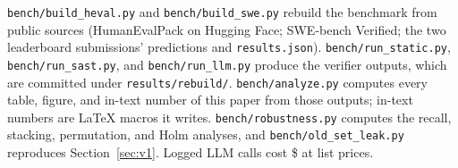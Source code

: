 \texttt{bench/build\_heval.py} and \texttt{bench/build\_swe.py} rebuild the benchmark from public sources (HumanEvalPack on Hugging Face; SWE-bench Verified; the two leaderboard submissions' predictions and \texttt{results.json}). \texttt{bench/run\_static.py}, \texttt{bench/run\_sast.py}, and \texttt{bench/run\_llm.py} produce the verifier outputs, which are committed under \texttt{results/rebuild/}. \texttt{bench/analyze.py} computes every table, figure, and in-text number of this paper from those outputs; in-text numbers are LaTeX macros it writes. \texttt{bench/robustness.py} computes the recall, stacking, permutation, and Holm analyses, and \texttt{bench/old\_set\_leak.py} reproduces Section~\ref{sec:v1}. Logged LLM calls cost \$\nCostUsd{} at list prices.
